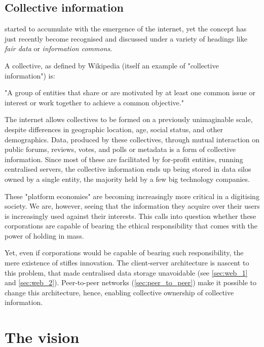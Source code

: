 \subsection{Collective information}\label{sec:collective_information}

 started to accumulate with the emergence of the internet, yet the concept has just recently become recognised and discussed under a variety of headings like \emph{fair data} or \emph{information commons}.

A collective, as defined by Wikipedia (itself an example of "collective information") is:
\begin{displayquote}
"A group of entities that share or are motivated by at least one common issue or interest or work together to achieve a common objective." 
\end{displayquote}
The internet allows collectives to be formed on a previously unimaginable scale, despite differences in geographic location, age, social status, and other demographics. Data,  produced by these collectives, through mutual interaction on public forums, reviews, votes, and polls or metadata is a form of collective information. Since most of these are facilitated by for-profit entities, running centralised servers, the collective information ends up being stored in data silos owned by a single entity, the majority held by a few big technology companies.

These "platform economies" are becoming increasingly more critical in a digitising society. We are, however, seeing that the information they acquire over their users is increasingly used against their interests. This calls into question whether these corporations are capable of bearing the ethical responsibility that comes with the power of holding  in mass.

Yet, even if corporations would be capable of bearing such responsibility, the mere existence of  stifles innovation. The client-server architecture is nascent to this problem, that made centralised data storage unavoidable (see \ref{sec:web_1} and \ref{sec:web_2}). Peer-to-peer networks (\ref{sec:peer_to_peer}) make it possible to change this architecture, hence, enabling collective ownership of collective information. 


\section{The vision}\label{sec:vision}

